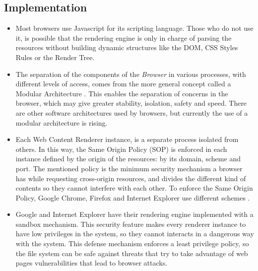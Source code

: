 \documentclass[prodmode,acmtecs]{acmsmall}
\begin{document}
  \subsection*{Implementation}
    \begin{itemize}\leftskip0.2em
      \item Most browsers use Javascript for its scripting language. Those who do not use it, is possible that the rendering engine is only in charge of parsing the resources without building dynamic structures like the DOM, CSS Styles Rules or the Render Tree.
      \item The separation of the components of the \textit{Browser} in various processes, with different levels of access, comes from the more general concept called a Modular Architecture \cite{Vrbanec2013}. This enables the separation of concerns in the browser, which may give greater stability, isolation, safety and speed. There are other software architectures used by browsers, but currently the use of a modular architecture is rising.
      \item Each Web Content Renderer instance, is a separate process isolated \cite{GoogleChromeIsolation,FirefoxThreatModel} from others. In this way, the Same Origin Policy (SOP) \cite{W3C-SOP} is enforced in each instance defined by the origin of the resources: by its domain, scheme and port. The mentioned policy  is the minimum security mechanism a browser has while requesting cross-origin resources, and divides the different kind of contents so they cannot interfere with each other. To enforce the Same Origin Policy, Google Chrome, Firefox and Internet Explorer use different schemes \cite{Crowley2010,Reis2009,Jackson2008}.
      \item Google and Internet Explorer have their rendering engine implemented with a sandbox mechanism. This security feature makes every renderer instance to have low privileges in the system, so they cannot interacts in a dangerous way with the system. This defense mechanism enforces a least privilege policy, so the file system can be safe against threats that try to take advantage of web pages vulnerabilities that lead to browser attacks.
    \end{itemize}
\end{document}
